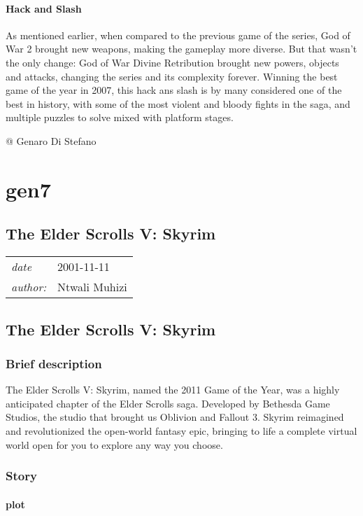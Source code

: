 \documentclass[a4paper,10pt]{book}
\newcommand{\pageHeader}[4]{
    \section{#1}
    \vspace{-0.3cm}
    \begin{table}[h!]
     \begin{tabular}{ll}
        \hline
        \textit{date} & #2 \\
        \textit{author: } & #3\\
        \hline
     \end{tabular}
    \end{table}
    \vspace{-0.3cm}
}
\begin{document}
 \subsubsection{Hack and Slash }
 
       As mentioned earlier, when compared to the previous game of the series, God of War 2 brought new weapons, making the gameplay more diverse. But that wasn't the only change: God of War Divine Retribution brought new powers, objects and attacks, changing the series and its complexity forever. Winning the best game of the year in 2007, this hack ans slash is by many considered one of the best in history, with some of the most violent and bloody fights in the saga, and multiple puzzles to solve mixed with platform stages.
           
 
 
 
 
 @ Genaro Di Stefano 
 
 \newpage\chapter{gen7}\newpage\pageHeader{The Elder Scrolls V: Skyrim}{2001-11-11}{Ntwali Muhizi}{The elder scrolls v page: one of the pioneers of RPGS}
 \section{The Elder Scrolls V: Skyrim }
 \subsection{Brief description }
 
          The Elder Scrolls V: Skyrim, named the 2011 Game of the Year, was a highly anticipated chapter of the Elder Scrolls saga. Developed by Bethesda Game Studios,
          the studio that brought us Oblivion and Fallout 3. Skyrim reimagined and revolutionized the open-world
          fantasy epic, bringing to life a complete virtual world open for you to explore any way you choose.
         
 \subsection{ Story }
 
 \subsubsection{plot }
 
\end{document}

